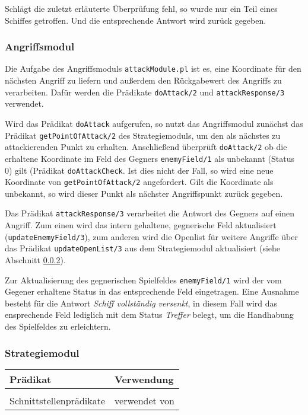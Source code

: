 	Schlägt die zuletzt erläuterte Überprüfung fehl, so wurde nur ein Teil eines Schiffes getroffen. Und die entsprechende Antwort wird zurück 
	gegeben.
	
	
	
\subsubsection{Angriffsmodul} \label{sec:attackModule}
	Die Aufgabe des Angriffsmoduls \texttt{attackModule.pl} ist es, eine Koordinate für den nächsten Angriff zu liefern und außerdem den 
	Rückgabewert des Angriffs zu verarbeiten. 
	Dafür werden die Prädikate \texttt{doAttack/2} und \texttt{attackResponse/3} verwendet. 
	
	Wird das Prädikat \texttt{doAttack} aufgerufen, so nutzt das Angriffsmodul zunächst das Prädikat \texttt{getPointOfAttack/2} des
	Strategiemoduls, um den als nächstes zu attackierenden Punkt zu erhalten. Anschließend überprüft \texttt{doAttack/2} 
	ob die erhaltene Koordinate im Feld des Gegners \texttt{enemyField/1} als unbekannt (Status 0) gilt (Prädikat \texttt{doAttackCheck}. 
	Ist dies nicht der Fall, so wird eine neue Koordinate von \texttt{getPointOfAttack/2} angefordert. 
	Gilt die Koordinate als unbekannt, so wird dieser Punkt als nächster Angriffspunkt zurück gegeben.
	
	Das Prädikat \texttt{attackResponse/3} verarbeitet die Antwort des Gegners auf einen Angriff. Zum einen wird das intern gehaltene, 
	gegnerische Feld aktualisiert (\texttt{updateEnemyField/3}), zum anderen wird die Openlist für weitere Angriffe über 
	das Prädikat \texttt{updateOpenList/3} aus dem Strategiemodul aktualisiert (siehe Abschnitt \ref{sec:strategy}).
	
	Zur Aktualisierung des gegnerischen Spielfeldes \texttt{enemyField/1} wird der vom Gegener erhaltene Status in das entsprechende 
	Feld eingetragen. Eine Ausnahme besteht für die Antwort \textit{Schiff vollständig versenkt}, in diesem Fall wird das ensprechende
	Feld lediglich mit dem Status \textit{Treffer} belegt, um die Handhabung des Spielfeldes zu erleichtern. 

\subsubsection{Strategiemodul} \label{sec:strategy}

	\begin{table}[H]
	\centering
		\begin{tabular} { | l | l |}
		\hline
		Prädikat & Verwendung \\
		\hline
		 &  \\
		\hline
		Schnittstellenprädikate & verwendet von \\
		\hline
		\end{tabular}
	\end{table}
	
